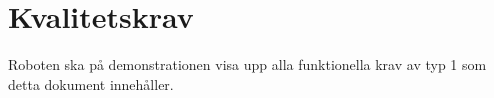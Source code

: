 \section{Kvalitetskrav}
Roboten ska på demonstrationen visa upp alla funktionella krav av typ 1 som detta dokument innehåller.